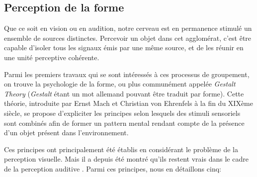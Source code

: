 \subsection{Perception de la forme}

Que ce soit en vision ou en audition, notre cerveau est en permanence stimulé un ensemble de sources distinctes. Percevoir un objet dans cet agglomérat, c'est être capable d'isoler tous les signaux émis par une même source, et de les réunir en une unité perceptive cohérente.

Parmi les premiers travaux qui se sont intéressés à ces processus de groupement, on trouve la psychologie de la forme, ou plus communément appelée \emph{Gestalt Theory} (\emph{Gestalt} étant un mot allemand pouvant être traduit par forme). Cette théorie, introduite par Ernst Mach et Christian von Ehrenfels à la fin du XIXème siècle, se propose d'expliciter les principes selon lesquels des stimuli sensoriels sont combinés afin de former un pattern mental rendant compte de la présence d'un objet présent dans l'environnement. 

Ces principes ont principalement été établis en considérant le problème de la perception visuelle. Mais il a depuis été montré qu'ils restent vrais dans le cadre de la perception auditive \citep[ch. 1]{bregman1994auditory}. Parmi ces principes, nous en détaillons cinq:

